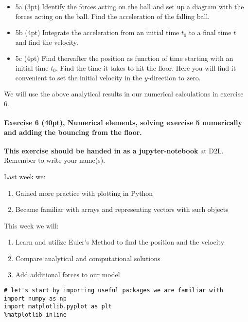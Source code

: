 \documentclass[%
oneside,                 %
final,                   %
10pt]{article}
\begin{document}
\begin{itemize}
\item 5a (3pt) Identify the forces acting on the ball and set up a diagram with the forces acting on the ball. Find the acceleration of the falling ball. 

\item 5b (4pt) Integrate the acceleration from an initial time $t_0$ to a final time $t$ and find the velocity.

\item 5c (4pt) Find thereafter the position as function of time starting with an initial time $t_0$. Find the time it takes to hit the floor.  Here you will find it convenient to set the initial velocity in the $y$-direction to zero.
\end{itemize}

\noindent
We will use the above analytical results in our numerical calculations in exercise 6.




\paragraph{Exercise 6 (40pt), Numerical elements, solving exercise 5 numerically and adding the bouncing from the floor.}
\textbf{This exercise should be handed in as a jupyter-notebook} at D2L. Remember to write your name(s). 

Last week we:
\begin{enumerate}
\item Gained more practice with plotting in Python

\item Became familiar with arrays and representing vectors with such objects
\end{enumerate}

\noindent
This week we will:
\begin{enumerate}
\item Learn and utilize Euler's Method to find the position and the velocity

\item Compare analytical and computational solutions 

\item Add additional forces to our model
\end{enumerate}

\begin{verbatim}
# let's start by importing useful packages we are familiar with
import numpy as np
import matplotlib.pyplot as plt
%matplotlib inline
\end{verbatim}
\end{document}
